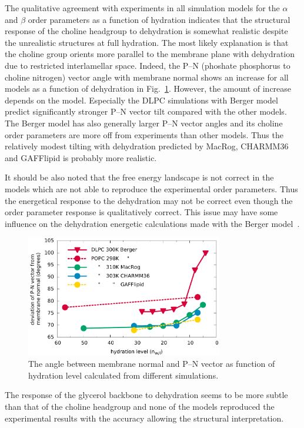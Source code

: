 \documentclass[journal=jacsat,manuscript=article]{achemso}
\begin{document}
The qualitative agreement with experiments in all simulation models for the $\alpha$ and $\beta$ order parameters  
as a function of hydration indicates that the structural response of the choline headgroup to dehydration is somewhat realistic
despite the unrealistic structures at full hydration. 
The most likely explanation is that the choline group
orients more parallel to the membrane plane with dehydration due to restricted interlamellar space. 
Indeed, the P--N (phoshate phosphorus to choline nitrogen) vector angle with membrane normal shows an increase for
all models as a function of dehydration in Fig.~\ref{PNangle}.
However, the amount of increase depends on the model. Especially the DLPC simulations with Berger model
predict significantly stronger P--N vector tilt compared with the other models. The Berger model
has also generally larger P--N vector angles and its choline order parameters are more off from
experiments than other models. Thus the relatively modest tilting with dehydration
predicted by MacRog, CHARMM36 and GAFFlipid is probably more realistic.

It should be also noted that the free energy landscape is not correct in the models which
are not able to reproduce the experimental order parameters. Thus the energetical response
to the dehydration may not be correct even though the order parameter response is qualitatively correct.
This issue may have some influence on the dehydration energetic calculations made with the Berger model~\cite{eun09,schneck12}.
\begin{figure}[]
  \centering
  \includegraphics[width=8.6cm]{../Fig/dehydrationPN.pdf}

  \caption{\label{PNangle}
    The angle between membrane normal and P--N vector as function of
    hydration level calculated from different simulations.
  }
\end{figure}

The response of the glycerol backbone to dehydration seems to be more subtle than that of the choline headgroup 
and none of the models reproduced the experimental results with the accuracy allowing
the structural interpretation.
\end{document}
